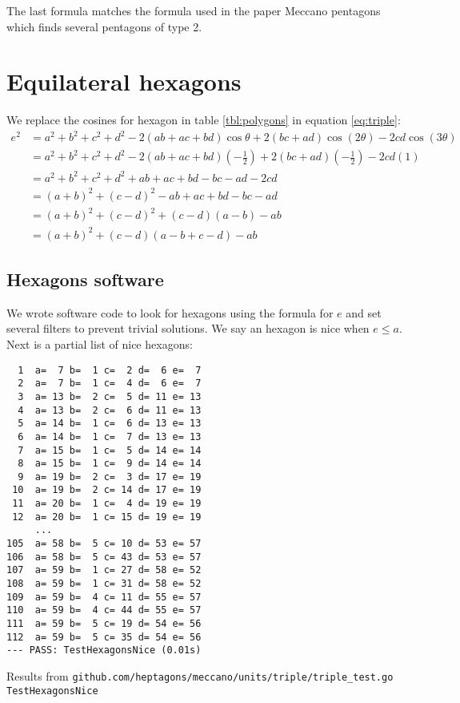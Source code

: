 \documentclass[11pt]{article}
\begin{document}

The last formula matches the formula used in the paper Meccano pentagons which finds several pentagons of type 2. 


\section{Equilateral hexagons}

We replace the cosines for hexagon in table \ref{tbl:polygons} in equation \ref{eq:triple}:
\begin{align}
e^2 &= a^2 +b^2 +c^2 +d^2 -2(ab+ac+bd)\cos\theta +2(bc+ad)\cos(2\theta) -2cd\cos(3\theta) \nonumber\\
 &= a^2 +b^2 +c^2 +d^2 -2(ab+ac+bd)\left(-\frac{1}{2}\right) +2(bc+ad)\left(-\frac{1}{2}\right) -2cd(1) \nonumber\\
 &= a^2 +b^2 +c^2 +d^2 +ab+ac+bd -bc-ad-2cd \nonumber\\
 &= (a+b)^2 +(c-d)^2 -ab+ac+bd-bc-ad\nonumber\\
 &= (a+b)^2 +(c-d)^2 +(c-d)(a-b) -ab \nonumber\\
 &= (a+b)^2 +(c-d)(a-b+c-d) -ab
\end{align} 


\subsection{Hexagons software}
We wrote software code to look for hexagons using the formula for $e$ and set several
filters to prevent trivial solutions. We say an hexagon is nice when $e \leq a$.
Next is a partial list of nice hexagons:
\begin{lstlisting}
  1  a=  7 b=  1 c=  2 d=  6 e=  7
  2  a=  7 b=  1 c=  4 d=  6 e=  7
  3  a= 13 b=  2 c=  5 d= 11 e= 13
  4  a= 13 b=  2 c=  6 d= 11 e= 13
  5  a= 14 b=  1 c=  6 d= 13 e= 13
  6  a= 14 b=  1 c=  7 d= 13 e= 13
  7  a= 15 b=  1 c=  5 d= 14 e= 14
  8  a= 15 b=  1 c=  9 d= 14 e= 14
  9  a= 19 b=  2 c=  3 d= 17 e= 19
 10  a= 19 b=  2 c= 14 d= 17 e= 19
 11  a= 20 b=  1 c=  4 d= 19 e= 19
 12  a= 20 b=  1 c= 15 d= 19 e= 19
     ...
105  a= 58 b=  5 c= 10 d= 53 e= 57
106  a= 58 b=  5 c= 43 d= 53 e= 57
107  a= 59 b=  1 c= 27 d= 58 e= 52
108  a= 59 b=  1 c= 31 d= 58 e= 52
109  a= 59 b=  4 c= 11 d= 55 e= 57
110  a= 59 b=  4 c= 44 d= 55 e= 57
111  a= 59 b=  5 c= 19 d= 54 e= 56
112  a= 59 b=  5 c= 35 d= 54 e= 56
--- PASS: TestHexagonsNice (0.01s)
\end{lstlisting}
Results from \texttt{github.com/heptagons/meccano/units/triple/triple\_test.go TestHexagonsNice}
\end{document}
